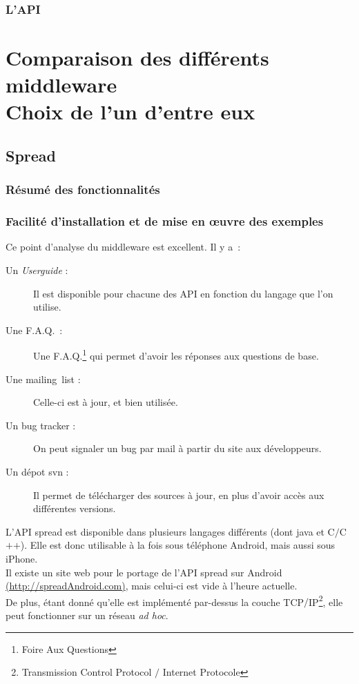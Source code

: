 \documentclass[a4paper,10pt]{report}
\begin{document}
\section{L'API}

\part{Comparaison des différents middleware \\ Choix de l'un d'entre eux}

\chapter{Spread}

\section{Résumé des fonctionnalités}

\section{Facilité d'installation et de mise en œuvre des exemples}

Ce point d'analyse du middleware est excellent. Il y a~:
\begin{description}
  \item[Un \emph{Userguide} :] Il est disponible pour chacune des API en fonction du langage que l'on utilise.
  \item[Une F.A.Q.~:] Une F.A.Q.\footnote{Foire Aux Questions} qui permet d'avoir les réponses aux questions de base.
  \item[Une mailing~list :] Celle-ci est à jour, et bien utilisée.
  \item[Un bug tracker :] On peut signaler un bug par mail à partir du site aux développeurs.
  \item[Un dépot svn :] Il permet de télécharger des sources à jour, en plus d'avoir accès aux différentes versions.
\end{description}



L'API spread est disponible dans plusieurs langages différents (dont java et C$/$C$+$$+$). Elle est donc utilisable à la fois sous téléphone Android, mais aussi sous iPhone.\\
Il existe un site web pour le portage de l'API spread sur Android \href{http://spreadAndroid.com}{(http://spreadAndroid.com)}, mais celui-ci est vide à l'heure actuelle.\\
De plus, étant donné qu'elle est implémenté par-dessus la couche TCP$/$IP\footnote{Transmission Control Protocol $/$ Internet Protocole}, elle peut fonctionner sur un réseau \emph{ad hoc}.
\end{document}
